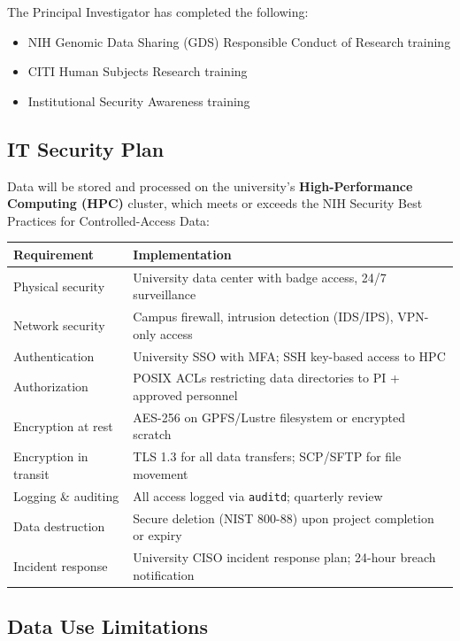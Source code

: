 \documentclass[11pt,letterpaper]{article}
\begin{document}
\bigskip
\noindent The Principal Investigator has completed the following:
\begin{itemize}[nosep]
    \item NIH Genomic Data Sharing (GDS) Responsible Conduct of Research training
    \item CITI Human Subjects Research training
    \item Institutional Security Awareness training
\end{itemize}

\subsection{IT Security Plan}

Data will be stored and processed on the university's
\textbf{High-Performance Computing (HPC)} cluster, which meets or
exceeds the NIH Security Best Practices for Controlled-Access Data:

\begin{longtable}{@{} p{4cm} p{9cm} @{}}
\toprule
\textbf{Requirement} & \textbf{Implementation} \\
\midrule
\endhead
Physical security & University data center with badge access, 24/7 surveillance \\
Network security & Campus firewall, intrusion detection (IDS/IPS), VPN-only access \\
Authentication & University SSO with MFA; SSH key-based access to HPC \\
Authorization & POSIX ACLs restricting data directories to PI + approved personnel \\
Encryption at rest & AES-256 on GPFS/Lustre filesystem or encrypted scratch \\
Encryption in transit & TLS 1.3 for all data transfers; SCP/SFTP for file movement \\
Logging \& auditing & All access logged via \texttt{auditd}; quarterly review \\
Data destruction & Secure deletion (NIST 800-88) upon project completion or expiry \\
Incident response & University CISO incident response plan; 24-hour breach notification \\
\bottomrule
\end{longtable}

\subsection{Data Use Limitations}
\end{document}
